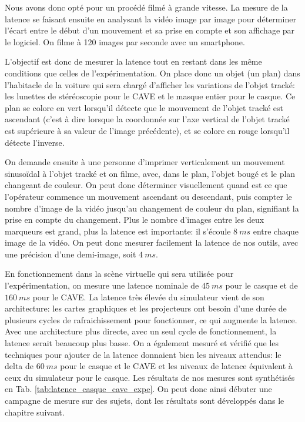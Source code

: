 	\par Nous avons donc opté pour un procédé filmé à grande vitesse. La mesure de la latence se faisant ensuite en analysant la vidéo image par image pour déterminer l'écart entre le début d'un mouvement et sa prise en compte et son affichage par le logiciel. On filme à 120 images par seconde avec un smartphone.
	
	\par L'objectif est donc de mesurer la latence tout en restant dans les même conditions que celles de l'expérimentation. On place donc un objet (un plan) dans l'habitacle de la voiture qui sera chargé d'afficher les variations de l'objet tracké: les lunettes de stéréoscopie pour le CAVE et le masque entier pour le casque. Ce plan se colore en vert lorsqu'il détecte que le mouvement de l'objet tracké est ascendant (c'est à dire lorsque la coordonnée sur l'axe vertical de l'objet tracké est supérieure à sa valeur de l'image précédente), et se colore en rouge lorsqu'il détecte l'inverse.
	
	\par On demande ensuite à une personne d'imprimer verticalement un mouvement sinusoïdal à l'objet tracké et on filme, avec, dans le plan, l'objet bougé et le plan changeant de couleur. On peut donc déterminer visuellement quand est ce que l'opérateur commence un mouvement ascendant ou descendant, puis compter le nombre d'image de la vidéo jusqu'au changement de couleur du plan, signifiant la prise en compte du changement. Plus le nombre d'images entre les deux marqueurs est grand, plus la latence est importante: il s'écoule $8~ms$ entre chaque image de la vidéo. On peut donc mesurer facilement la latence de nos outils, avec une précision d'une demi-image, soit $4~ms$.
	
	\par En fonctionnement dans la scène virtuelle qui sera utilisée pour l'expérimentation, on mesure une latence nominale de $45~ms$ pour le casque et de $160~ms$ pour le CAVE. La latence très élevée du simulateur vient de son architecture: les cartes graphiques et les projecteurs ont besoin d'une durée de plusieurs cycles de rafraichissement pour fonctionner, ce qui augmente la latence. Avec une architecture plus directe, avec un seul cycle de fonctionnement, la latence serait beaucoup plus basse. On a également mesuré et vérifié que les techniques pour ajouter de la latence donnaient bien les niveaux attendus: le delta de $60~ms$ pour le casque et le CAVE et les niveaux de latence équivalent à ceux du simulateur pour le casque. Les résultats de nos mesures sont synthétisés en Tab. \ref{tab:latence_casque_cave_expe}. On peut donc ainsi débuter une campagne de mesure sur des sujets, dont les résultats sont développés dans le chapitre suivant.
	
